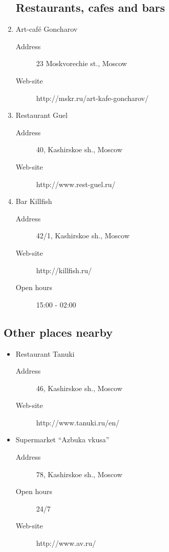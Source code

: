 \documentclass[10pt,fleqn,openany]{book} %
\begin{document}
\begin{enumerate}
    \subsection{Restaurants, cafes and bars}
    	
    	\item Art-café Goncharov
	    	\begin{description}
	    		\item[Address] 23 Moskvorechie st., Moscow
	    		\item[Web-site] http://mskr.ru/art-kafe-goncharov/
	    	\end{description}
    	
    	\item Restaurant Guel 
		   	\begin{description}
		   		\item[Address] 40, Kashirskoe sh., Moscow
		   		\item[Web-site] http://www.rest-guel.ru/
		   	\end{description}    
    	
    	\item Bar Killfish
	    	\begin{description}
	    		\item[Address] 42/1, Kashirskoe sh., Moscow
	    		\item[Web-site] http://killfish.ru/
	    		\item[Open hours] 15:00 - 02:00
	    	\end{description} 
\end{enumerate}

\subsection{Other places nearby}

\begin{itemize}
	
	\item Restaurant Tanuki 
	\begin{description}
		\item[Address] 46, Kashirskoe sh., Moscow
		\item[Web-site] http://www.tanuki.ru/en/
	\end{description}
	
	\item Supermarket “Azbuka vkusa”
	\begin{description}
		\item[Address] 78, Kashirskoe sh., Moscow
		\item[Open hours] 24/7
		\item[Web-site] http://www.av.ru/  
	\end{description}
	
\end{itemize}
\end{document}
